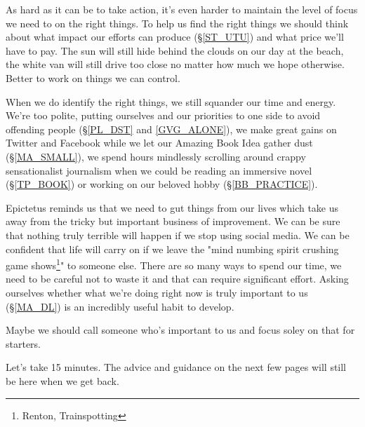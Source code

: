 \cleardoublepage
{\small

As hard as it can be to take action, it's even harder to maintain the level of focus we need to on the right things. To help us find the right things we should think about what impact our efforts can produce (\S \ref{ST_UTU}) and what price we'll have to pay. The sun will still hide behind the clouds on our day at the beach, the white van will still drive too close no matter how much we hope otherwise. Better to work on things we can control.  %

When we do identify the right things, we still squander our time and energy. We're too polite, putting ourselves and our priorities to one side to avoid offending people (\S \ref{PL_DST} and \ref{GVG_ALONE}), we make great gains on Twitter and Facebook while we let our Amazing Book Idea gather dust (\S \ref{MA_SMALL}), we spend hours mindlessly scrolling around crappy sensationalist journalism when we could be reading an immersive novel (\S \ref{TP_BOOK}) or working on our beloved hobby (\S \ref{BB_PRACTICE}). 

Epictetus reminds us that we need to gut things from our lives which take us away from the tricky but important business of improvement. We can be sure that nothing truly terrible will happen if we stop using social media. We can be confident that life will carry on if we leave the "mind numbing spirit crushing game shows\footnote{Renton, Trainspotting}" to someone else. There are so many ways to spend our time, we need to be careful not to waste it and that can require significant effort. Asking ourselves whether what we're doing right now is truly important to us (\S \ref{MA_DL}) is an incredibly useful habit to develop.

Maybe we should call someone who's important to us and focus soley on that for starters. 

Let's take 15 minutes. The advice and guidance on the next few pages will still be here when we get back. 

}
